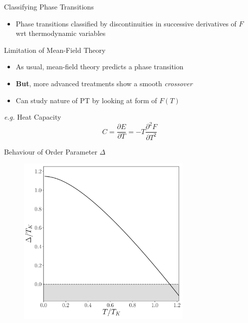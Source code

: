 \documentclass[13pt]{beamer}
\begin{document}
  \begin{frame}{Classifying Phase Transitions}

  \begin{itemize}
    \item Phase transitions classified by discontinuities in successive derivatives of $ F $ wrt thermodynamic variables
  \end{itemize}

  \begin{alertblock}{Limitation of Mean-Field Theory}
    \begin{itemize}
      \item As usual, mean-field theory predicts a phase transition
      \item \textbf{But}, more advanced treatments show a smooth \emph{crossover}
    \end{itemize}
  \end{alertblock}

  \begin{itemize}
    \item Can study nature of PT by looking at form of $ F(T) $
  \end{itemize}

  \begin{exampleblock}{\textit{e.g.} Heat Capacity}
  $$ C = \frac{\partial E}{\partial T} = - T \frac{\partial^2 F}{\partial T^2} $$
  \end{exampleblock}

  \end{frame}

  \begin{frame}{Behaviour of Order Parameter $ \Delta $}

  \begin{figure}
    \centering
    \includegraphics[width=0.75\textwidth]{Figures/delta_vs_T.pdf}
  \end{figure}

  \end{frame}
\end{document}
